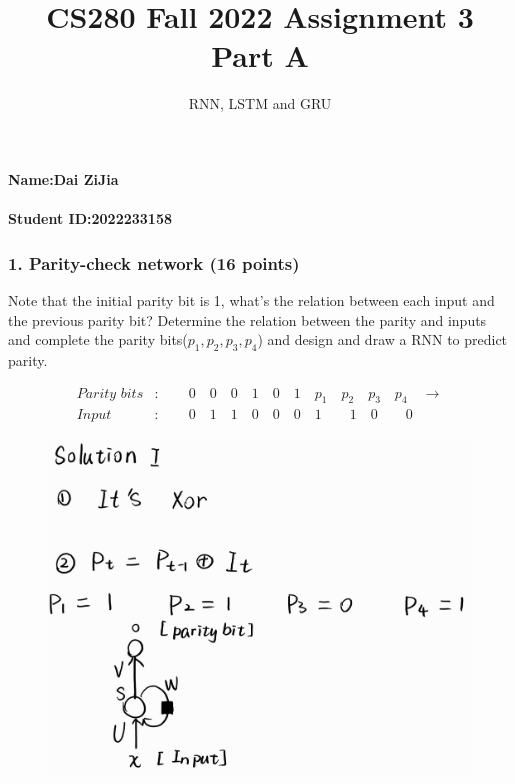 \documentclass[12pt]{article}%
\begin{document}
\title{CS280 Fall 2022 Assignment 3 \\ Part A}
\author{RNN, LSTM and GRU}
\maketitle

\paragraph{Name:Dai ZiJia}

\paragraph{Student ID:2022233158}

\newpage


\subsubsection*{1. Parity-check network (16 points)}
Note that the initial parity bit is 1, what's the relation between each input and the previous parity bit? Determine the relation between the parity and inputs and complete the parity bits($p_1,p_2,p_3,p_4$) and design and draw a RNN to predict parity. 
	
	\begin{align*}
	    \textit{Parity bits}&:\quad\quad0\quad0\quad0\quad1\quad0\quad1\quad p_1\quad p_2\quad p_3 \quad p_4 \quad\rightarrow \\
	    \textit{Input}&:\quad\quad0\quad1\quad1\quad0\quad0\quad0\quad1\qquad1\quad0\qquad0
	\end{align*}

\begin{figure}[!h]
	\centering
	\includegraphics[width=5in]{1.jpg}
\end{figure}
\end{document}
